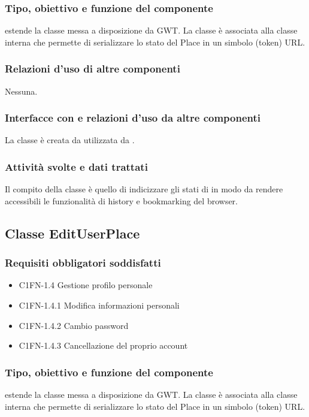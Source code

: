 \subsubsection*{Tipo, obiettivo e funzione del componente}
 estende la classe  messa a disposizione da GWT. La
classe \`e associata alla classe interna  che permette di
serializzare lo stato del Place in un simbolo (token) URL.
\subsubsection*{Relazioni d'uso di altre componenti}
Nessuna.
\subsubsection*{Interfacce con e relazioni d'uso da altre componenti}
La classe \`e creata da  utilizzata da .
\subsubsection*{Attivit\`a svolte e dati trattati}
Il compito della classe \`e quello di indicizzare gli stati di
 in modo da rendere accessibili le funzionalit\`a di history
e bookmarking del browser.

\subsection{Classe EditUserPlace}
\subsubsection*{Requisiti obbligatori soddisfatti}
\begin{itemize}
	\item C1FN-1.4 Gestione profilo personale
	\item C1FN-1.4.1 Modifica informazioni personali
	\item C1FN-1.4.2 Cambio password
	\item C1FN-1.4.3 Cancellazione del proprio account
\end{itemize}
\subsubsection*{Tipo, obiettivo e funzione del componente}
 estende la classe  messa a disposizione da GWT. La
classe \`e associata alla classe interna  che permette di
serializzare lo stato del Place in un simbolo (token) URL.
